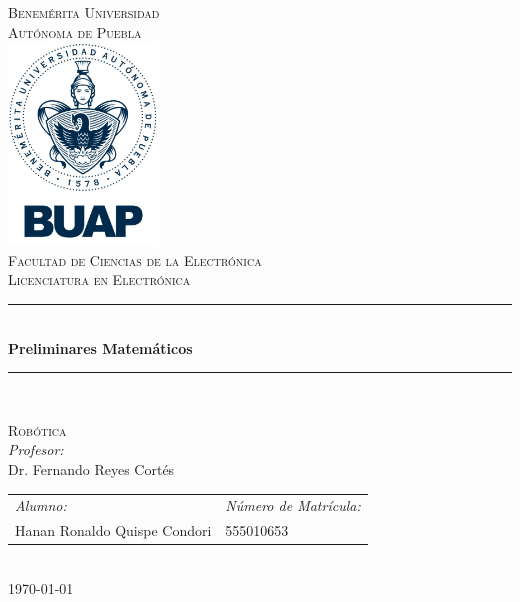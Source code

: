 \documentclass[12pt]{article}
\date{\today}
\begin{document}
\begin{titlepage}
\newcommand{\HRule}{\rule{\linewidth}{0.5mm}} 
\center
\textsc{\LARGE  Benemérita Universidad \\[0.2cm] Autónoma de Puebla}\\[1.5cm] 
\includegraphics[width=4cm]{IMAGENES/escudo}\\[1cm]
\textsc{\Large Facultad de Ciencias de la Electrónica}\\[0.5cm] 
\textsc{\large Licenciatura en Electrónica}\\[0.5cm]
\HRule \\[0.4cm]
{ \huge \bfseries Preliminares Matemáticos}\\[0.4cm] 
\HRule \\[1.5cm]
\begin{minipage}{\textwidth}
\center 
\textsc{\LARGE Robótica}\\[1.7cm] 
\emph{Profesor:} \\
Dr. Fernando Reyes Cortés \\[1cm]
\begin{tabular}{ll}
\emph{Alumno:} & \emph{Número de Matrícula:}\\
Hanan Ronaldo Quispe Condori  & 555010653\\
\end{tabular}
\end{minipage}\\[2cm]
\today
\end{titlepage}

\newpage
\end{document}
